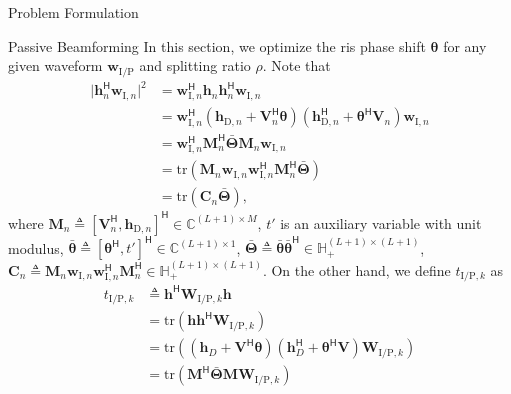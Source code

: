 \begin{section}{Problem Formulation}
	\begin{subsection}{Passive Beamforming}
		In this section, we optimize the \gls{ris} phase shift $\boldsymbol{\theta}$ for any given waveform $\mathbf{w}_{\mathrm{I/P}}$ and splitting ratio $\rho$. Note that
		\begin{align}
			\lvert \mathbf{h}_{n}^\mathsf{H}\mathbf{w}_{\mathrm{I},n} \rvert^2
			& = \mathbf{w}_{\mathrm{I},n}^\mathsf{H}\mathbf{h}_n\mathbf{h}_n^\mathsf{H}\mathbf{w}_{\mathrm{I},n}\nonumber\\
			& = \mathbf{w}_{\mathrm{I},n}^\mathsf{H}(\mathbf{h}_{\mathrm{D},n}+\mathbf{V}_n^\mathsf{H}\boldsymbol{\theta})(\mathbf{h}_{\mathrm{D},n}^\mathsf{H}+\boldsymbol{\theta}^\mathsf{H}\mathbf{V}_n)\mathbf{w}_{\mathrm{I},n}\nonumber\\
			& = \mathbf{w}_{\mathrm{I},n}^\mathsf{H}\mathbf{M}_n^\mathsf{H}\bar{\mathbf{\Theta}}\mathbf{M}_n\mathbf{w}_{\mathrm{I},n}\nonumber\\
			& = \mathrm{tr}(\mathbf{M}_n\mathbf{w}_{\mathrm{I},n}\mathbf{w}_{\mathrm{I},n}^\mathsf{H}\mathbf{M}_n^\mathsf{H}\bar{\mathbf{\Theta}})\nonumber\\
			& = \mathrm{tr}(\mathbf{C}_n\bar{\mathbf{\Theta}}),
		\end{align}
		where $\mathbf{M}_n \triangleq [\mathbf{V}_n^\mathsf{H}, \mathbf{h}_{\mathrm{D},n}]^\mathsf{H} \in \mathbb{C}^{(L+1) \times M}$, $t'$ is an auxiliary variable with unit modulus, $\bar{\boldsymbol{\theta}} \triangleq [\boldsymbol{\theta}^\mathsf{H}, t']^\mathsf{H} \in \mathbb{C}^{(L+1) \times 1}$, $\bar{\mathbf{\Theta}} \triangleq \bar{\boldsymbol{\theta}}\bar{\boldsymbol{\theta}}^\mathsf{H} \in \mathbb{H}_+^{(L+1) \times (L+1)}$, $\mathbf{C}_n \triangleq \mathbf{M}_n\mathbf{w}_{\mathrm{I},n}\mathbf{w}_{\mathrm{I},n}^\mathsf{H}\mathbf{M}_n^\mathsf{H} \in \mathbb{H}_+^{(L+1)\times(L+1)}$. On the other hand, we define $t_{\mathrm{I/P},k}$ as
		\begin{align}
			t_{\mathrm{I/P},k}
			& \triangleq \mathbf{h}^\mathsf{H}\mathbf{W}_{\mathrm{I/P},k}\mathbf{h}\nonumber\\
			& = \mathrm{tr}(\mathbf{h}\mathbf{h}^\mathsf{H}\mathbf{W}_{\mathrm{I/P},k})\nonumber\\
			& = \mathrm{tr}\left((\mathbf{h}_{D}+\mathbf{V}^\mathsf{H}\boldsymbol{\theta})(\mathbf{h}_{D}^\mathsf{H}+\boldsymbol{\theta}^\mathsf{H}\mathbf{V})\mathbf{W}_{\mathrm{I/P},k}\right)\nonumber\\
			& = \mathrm{tr}(\mathbf{M}^\mathsf{H}\bar{\mathbf{\Theta}}\mathbf{M}\mathbf{W}_{\mathrm{I/P},k})\nonumber\\

\end{align}
\end{subsection}
\end{section}
